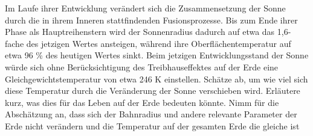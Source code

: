 \begin{Exercise}[label = Schicksal der Erde, title = Schicksal der Erde, difficulty = 3, origin = 1. Runde zur 46. IPhO 2015]
Im Laufe ihrer Entwicklung verändert sich die Zusammensetzung der Sonne durch die in ihrem
Inneren stattfindenden Fusionsprozesse. Bis zum Ende ihrer Phase als Hauptreihenstern wird
der Sonnenradius dadurch auf etwa das 1,6-fache des jetzigen Wertes ansteigen, während ihre
Oberflächentemperatur auf etwa 96 \% des heutigen Wertes sinkt.
Beim jetzigen Entwicklungsstand der Sonne würde sich ohne Berücksichtigung des Treibhauseffektes auf der Erde eine Gleichgewichtstemperatur von etwa
246
K einstellen.
Schätze ab, um wie viel sich diese Temperatur durch die Veränderung der Sonne verschieben
wird. Erläutere kurz, was dies für das Leben auf der Erde bedeuten könnte.
Nimm für die Abschätzung an, dass sich der Bahnradius und andere relevante Parameter der
Erde nicht verändern und die Temperatur auf der gesamten Erde die gleiche ist
\end{Exercise}
